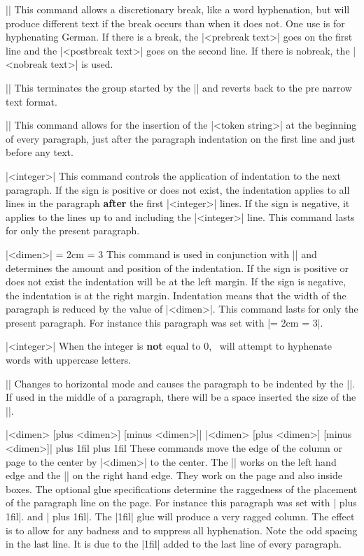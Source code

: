 \mbr
\pri\@||
\nbr
This command allows a discretionary break, like a word hyphenation, but
will produce different text if the break occurs than when it does not. One use
is for hyphenating German. If
there is a break, the |<prebreak text>| goes on the first line and the
|<postbreak text>| goes on the second line. If there is nobreak, the
|<nobreak text>| is used.

\mbr
\ext\@|\endnarrowtext|
\nbr
This terminates the group started by  the |\beginnarrowtext|
and reverts back to the pre narrow text format.

\mbr
\pri\@||
\nbr
This command allows for the insertion of the |<token string>| at the beginning
of every paragraph, just after the paragraph indentation on the first line
and just before any text.


\mbr
\pri\@|\hangafter [+ -] <integer>|
\nbr
This command controls the application of indentation to the next
paragraph. If the sign is positive or does not exist, the indentation applies
to all lines in the paragraph {\bf after} the first |<integer>| lines. If the
sign is negative, it applies to the lines up to and including the |<integer>|
line. This command lasts for only the present paragraph.

\mbr
\pri\@|\hangindent [=] [+ -] <dimen>|
\nbr
\hangindent = 2cm \hangafter = 3
This command is used in conjunction with |\hangafter| and determines the
amount and position of the indentation. If the sign is positive or does not
exist the indentation will be at the left margin. If the sign is negative,
the indentation is at the right margin. Indentation means that the width of
the paragraph is reduced by the value of |<dimen>|. This command lasts 
for only the present paragraph. For instance this
paragraph was set with |\hangindent = 2cm \hangafter = 3|.



\mbr
\ext\@|\hyphenatecapitals [=] <integer>|
\nbr
When the integer is {\bf not} equal to 0, \tex\ will attempt
to hyphenate words with uppercase letters.

\mbr
\pri\@|\indent|
\nbr
Changes to horizontal mode and causes the paragraph to be indented by the
|\parindent|. If used in the middle of a paragraph, there will be a space
inserted the size of the |\parindent|.

\mbr
\pri\@|\leftskip [=] <dimen> [plus <dimen>] [minus <dimen>]|
\nbr
\pri\@|\rightskip [=] <dimen> [plus <dimen>] [minus <dimen>]|
\nbr
\leftskip 0pt plus 1fil \rightskip 0pt plus 1fil
These commands move the  edge of the column or page to the center by
|<dimen>| to the center. The |\leftskip| works on the left hand edge and the
|\rightskip| on the right hand edge.
They  work on the page and also inside boxes. The
optional glue specifications 
determine the raggedness of the placement of the paragraph line on the
page. For instance this paragraph was set with |\leftskip 0pt plus 1fil|. 
and |\rightskip 0pt plus 1fil|. The |1fil| glue will 
produce a very ragged column. The effect is to allow for any badness and to
suppress all hyphenation. Note the odd spacing in the last line. It is due to
the |1fil| added to the last line of every paragraph. 

